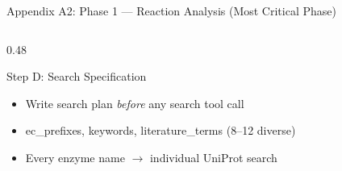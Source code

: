 \documentclass[aspectratio=169, 11pt]{beamer}
\begin{document}
\begin{frame}{Appendix A2: Phase 1 --- Reaction Analysis (Most Critical Phase)}
\begin{columns}[T]
\begin{column}{0.48\textwidth}
\begin{exampleblock}{\small Step D: Search Specification}
\vspace{-2pt}
\begin{itemize}\scriptsize
\setlength\itemsep{0pt}
\item Write search plan \textit{before} any search tool call
\item ec\_prefixes, keywords, literature\_terms (8--12 diverse)
\item Every enzyme name $\rightarrow$ individual UniProt search
\end{itemize}
\end{exampleblock}
\end{column}
\end{columns}
\end{frame}

\end{document}
